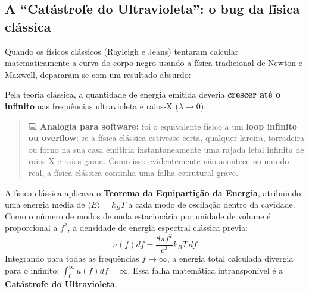 \documentclass[
  brazilian,
]{report}
\begin{document}
\subsection{A ``Catástrofe do Ultravioleta'': o bug da física
clássica}\label{a-catuxe1strofe-do-ultravioleta-o-bug-da-fuxedsica-cluxe1ssica}

Quando os físicos clássicos (Rayleigh e Jeans) tentaram calcular
matematicamente a curva do corpo negro usando a física tradicional de
Newton e Maxwell, depararam-se com um resultado absurdo:

Pela teoria clássica, a quantidade de energia emitida deveria
\textbf{crescer até o infinito} nas frequências ultravioleta e raios-X
(\(\lambda \to 0\)).

\begin{quote}
💻 \textbf{Analogia para software:} foi o equivalente físico a um
\textbf{loop infinito ou overflow}: se a física clássica estivesse
certa, qualquer lareira, torradeira ou forno na sua casa emitiria
instantaneamente uma rajada letal infinita de raios-X e raios gama. Como
isso evidentemente não acontece no mundo real, a física clássica
continha uma falha estrutural grave.
\end{quote}

\begin{tcolorbox}[enhanced jigsaw, arc=.35mm, bottomrule=.15mm, bottomtitle=1mm, breakable, colback=white, colbacktitle=quarto-callout-note-color!10!white, colframe=quarto-callout-note-color-frame, coltitle=black, left=2mm, leftrule=.75mm, opacityback=0, opacitybacktitle=0.6, rightrule=.15mm, title=\textcolor{quarto-callout-note-color}{\faInfo}\hspace{0.5em}{🔬 Quer se aprofundar na Física? Lei de Rayleigh-Jeans e Equipartição}, titlerule=0mm, toprule=.15mm, toptitle=1mm]

A física clássica aplicava o \textbf{Teorema da Equipartição da
Energia}, atribuindo uma energia média de \(\langle E \rangle = k_B T\)
a cada modo de oscilação dentro da cavidade. Como o número de modos de
onda estacionária por unidade de volume é proporcional a \(f^2\), a
densidade de energia espectral clássica previa:
\[u(f)df = \frac{8\pi f^2}{c^3} k_B T \, df\] Integrando para todas as
frequências \(f \to \infty\), a energia total calculada divergia para o
infinito: \(\int_0^\infty u(f)df = \infty\). Essa falha matemática
intransponível é a \textbf{Catástrofe do Ultravioleta}.

\end{tcolorbox}
\end{document}
